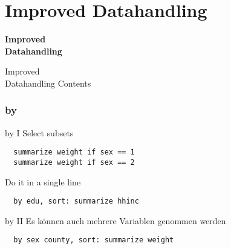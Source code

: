 \part{Improved Datahandling}
\begin{frame}
\thispagestyle{empty}
\textbf{\huge{Improved\\ Datahandling}}
\end{frame}

\begin{frame}{Improved\\ Datahandling Contents}
 \tableofcontents
\end{frame}

\section{by}
\begin{frame}[fragile]{by I}  
Select subsets
\begin{lstlisting}
  summarize weight if sex == 1
  summarize weight if sex == 2
\end{lstlisting}

Do it in a single line
\begin{lstlisting}
  by edu, sort: summarize hhinc
\end{lstlisting}

\end{frame}

\begin{frame}[fragile]{by II}
Es können auch mehrere Variablen genommen werden 
\begin{lstlisting}
  by sex county, sort: summarize weight
\end{lstlisting}
\end{frame}

